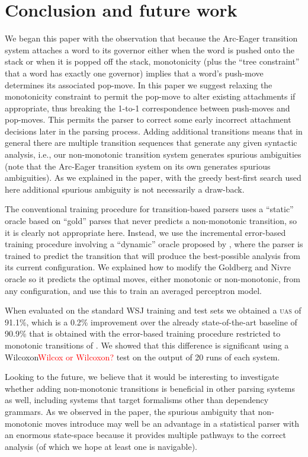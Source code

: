 \documentclass[11pt,letterpaper]{article}
\newcommand{\uas}{\textsc{uas}\xspace}
\newcommand{\note}[1]{\textcolor{red}{#1}}
\begin{document}
\section{Conclusion and future work}

\noindent
We began this paper with the observation that because the Arc-Eager transition system \citep{nivre:04}
attaches a word to its governor either when the word is pushed onto the stack or when it is
popped off the stack, monotonicity (plus the ``tree constraint'' that a word has exactly one governor)
implies that a word's push-move determines its associated pop-move. In this paper we suggest relaxing
the monotonicity constraint to permit the pop-move to alter existing attachments if appropriate,
thus breaking the 1-to-1 correspondence between push-moves and pop-moves.  This permits the parser
to correct some early incorrect attachment decisions later in the parsing process.
Adding additional transitions means
that in general there are multiple transition sequences that generate any given syntactic analysis,
i.e., our non-monotonic transition system generates spurious ambiguities (note that the
Arc-Eager transition system on its own generates spurious ambiguities).
As we explained in the paper, with the greedy best-first search used here additional
spurious ambiguity is
not necessarily a draw-back.

The conventional training procedure for transition-based parsers uses a ``static'' oracle
based on ``gold'' parses that never predicts a non-monotonic transition, so it is clearly not
appropriate here.  Instead, we use the incremental error-based training procedure involving
a ``dynamic'' oracle proposed by  \citet{goldberg:12}, where the parser is trained to
predict the transition that will produce
the best-possible analysis from its current configuration.  We explained how to modify the Goldberg
and Nivre oracle so it predicts the optimal moves, either monotonic or non-monotonic,
from any configuration, and use this to train an averaged perceptron model.

When evaluated on the standard WSJ training and test sets we obtained a \uas of 91.1\%,
which is a 0.2\% improvement over the already state-of-the-art baseline of
90.9\% that is obtained with the error-based training procedure restricted to monotonic transitions of
\citet{goldberg:12}.  We showed that this difference is significant using a
Wilcoxon\note{Wilcox or Wilcoxon?}
test on the output of 20 runs of each system.

Looking to the future, we believe that it would be interesting to investigate whether
adding non-monotonic transitions is beneficial in other parsing systems as well, including
systems that target formalisms other than dependency grammars.  As we observed
in the paper, the spurious ambiguity that non-monotonic moves introduce may well be an
advantage in a statistical parser with an enormous state-space because it provides
multiple pathways to the correct analysis (of which we hope at least one is navigable).
\end{document}
